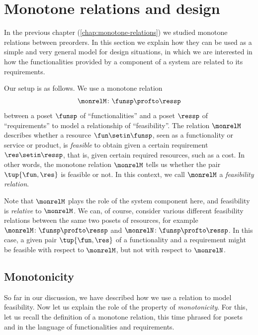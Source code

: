 
\section{Monotone relations and design}

In the previous chapter (\cref{chap:monotone-relations}) we studied monotone relations between preorders.
In this section we explain how they can be used as a simple and very general model for design situations, in which we are interested in how the functionalities provided by a component of a system are related to its requirements.

Our setup is as follows.
We use a monotone relation
\begin{equation}
    \monrelM \colon \funsp \profto \ressp
\end{equation}
between a poset $\funsp$ of ``functionalities'' and a poset $\ressp$ of ``requirements'' to model a relationship of ``feasibility''.
The relation $\monrelM$ describes whether a resource $\fun \setin \funsp$, seen as a functionality or service or product, is \emph{feasible} to obtain given a certain requirement $\res \setin \ressp$, that is, given certain required resources, such as a cost.
In other words, the monotone relation $\monrelM$ tells us whether the pair $\tup{\fun, \res}$ is feasible or not.
In this context, we call $\monrelM$ a \emph{feasibility relation}.

Note that $\monrelM$ plays the role of the system component here, and feasibility is \emph{relative} to $\monrelM$.
We can, of course, consider various different feasibility relations between the same two posets of resources, for example $\monrelM \colon \funsp \profto \ressp$ and $\monrelN \colon \funsp \profto \ressp$.
In this case, a given pair $\tup{\fun, \res}$ of a functionality and a requirement might be feasible with respect to $\monrelM$, but not with respect to $\monrelN$.

\subsection{Monotonicity}

So far in our discussion, we have described how we use a relation to model feasibility.
Now let us explain the role of the property of \emph{monotonicity}.
For this, let us recall the definition of a monotone relation, this time phrased for posets and in the language of functionalities and requirements.


